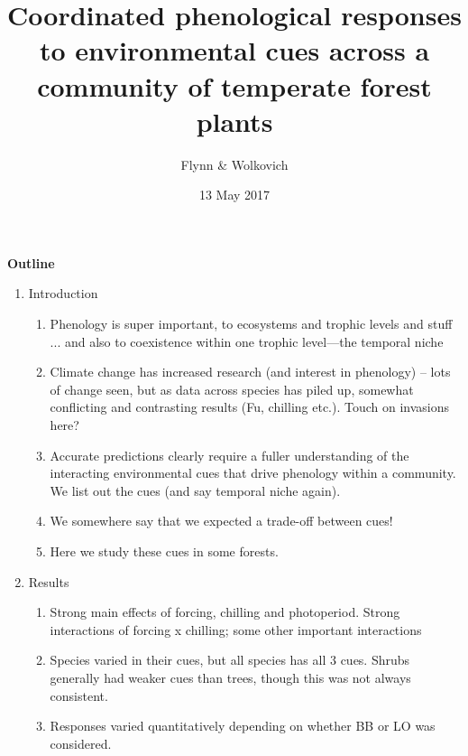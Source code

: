 \documentclass[11pt,a4paper]{article}
\begin{document}

\renewcommand{\refname}{\CHead{}}

\title{Coordinated phenological responses to environmental cues across a community of temperate forest plants}
\date{13 May 2017}
\author{Flynn \& Wolkovich}
\maketitle

{\bf Outline}


\begin{enumerate}

\item Introduction
\begin{enumerate}
\item Phenology is super important, to ecosystems and trophic levels and stuff ... and also to coexistence within one trophic level---the temporal niche
\item Climate change has increased research (and interest in phenology) -- lots of change seen, but as data across species has piled up, somewhat conflicting and contrasting results (Fu, chilling etc.). Touch on invasions here? 
\item Accurate predictions clearly require a fuller understanding of the interacting environmental cues that drive phenology within a community. We list out the cues (and say temporal niche again).
\item We somewhere say that we expected a trade-off between cues!
\item Here we study these cues in some forests.
\end{enumerate}

\item Results 
\begin{enumerate}
\item Strong main effects of forcing, chilling and photoperiod. Strong interactions of forcing x chilling; some other important interactions
\item Species varied in their cues, but all species has all 3 cues. Shrubs generally had weaker cues than trees, though this was not always consistent.
\item Responses varied quantitatively depending on whether BB or LO was considered.
\end{enumerate}


\end{enumerate}
\end{document}
